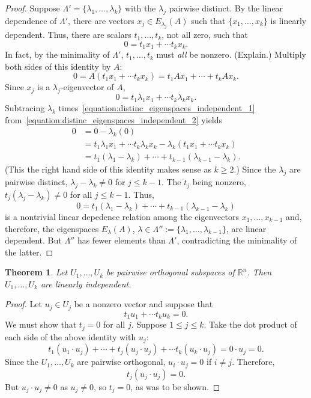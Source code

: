 \documentclass{amsart}
\newcommand{\RR}{\mathbb{R}}
\newtheorem{theorem}{Theorem}[section]
\theoremstyle{definition}
\begin{document}
\begin{proof}
  Suppose $\Lambda'=\{\lambda_1,\ldots,\lambda_k\}$ with the $\lambda_j$ pairwise distinct.
  By the linear dependence of $\Lambda'$, there are vectors $x_j\in E_{\lambda_j}(A)$ such that $\{x_1,\ldots,x_k\}$ is linearly dependent.
  Thus, there are scalars $t_1,\ldots,t_k$, not all zero, such that
  \begin{equation}\label{equation:distinc_eigenspaces_independent_1}
  0=t_1x_1+\cdots t_kx_k.
  \end{equation}
  In fact, by the minimality of $\Lambda'$, $t_1,\ldots,t_k$ must \emph{all} be nonzero. (Explain.)
  Multiply both sides of this identity by $A$:
  $$0 =A(t_1x_1+\cdots t_kx_k)
= t_1Ax_1+\cdots + t_kAx_k.
$$
Since $x_j$ is a $\lambda_j$-eigenvector of $A$,
\begin{equation}\label{equation:distinc_eigenspaces_independent_2}
  0 = t_1\lambda_1x_1 + \cdots t_k\lambda_kx_k.
\end{equation}
Subtracing $\lambda_k$ times~\eqref{equation:distinc_eigenspaces_independent_1} from~\eqref{equation:distinc_eigenspaces_independent_2} yields
\begin{align*}
0 &= 0 - \lambda_k(0) \\
&= t_1\lambda_1x_1+\cdots t_k\lambda_kx_k - \lambda_k(t_1x_1+\cdots t_kx_k)\\
&=t_1(\lambda_1-\lambda_k) + \cdots + t_{k-1}(\lambda_{k-1}-\lambda_k).
\end{align*}
(This the right hand side of this identity makes sense as $k\geq 2$.)
Since the $\lambda_j$ are pairwise distinct, $\lambda_j-\lambda_k\neq 0$ for $j\leq k-1$.
The $t_j$ being nonzero, $t_j(\lambda_j-\lambda_k)\neq 0$ for all $j\leq k-1$.
Thus,
$$
0=t_1(\lambda_1-\lambda_k) + \cdots + t_{k-1}(\lambda_{k-1}-\lambda_k)
$$
is a nontrivial linear depedence relation among the eigenvectors $x_1,\ldots,x_{k-1}$ and, therefore,
the eigenspaces $E_{\lambda}(A)$, $\lambda\in \Lambda'':=\{\lambda_1,\ldots,\lambda_{k-1}\}$, are linear dependent.
But $\Lambda''$ has fewer elements than $\Lambda'$, contradicting the minimality of the latter.
\end{proof}

\begin{theorem}
  Let $U_1,\ldots,U_k$ be pairwise orthogonal subspaces of $\RR^n$. Then $U_1,\ldots,U_k$ are linearly independent.
\end{theorem}

\begin{proof}
  Let $u_j\in U_j$ be a nonzero vector and suppose that
  $$t_1u_1+\cdots t_ku_k=0.$$
  We must show that $t_j=0$ for all $j$.
  Suppose $1\leq j\leq k$.
  Take the dot product of each side of the above identity with $u_j$:
  $$
  t_1(u_1\cdot u_j) + \cdots + t_j(u_j\cdot u_j) + \cdots t_k(u_k\cdot u_j) = 0\cdot u_j = 0.
  $$
  Since the $U_1, \ldots, U_k$ are pairwise orthogonal, $u_i\cdot u_j=0$ if $i\neq j$.
  Therefore,
  $$
  t_j(u_j\cdot u_j) = 0.
  $$
  But $u_j\cdot u_j\neq 0$ as $u_j\neq 0$, so $t_j=0$, as was to be shown.
\end{proof}
\end{document}
